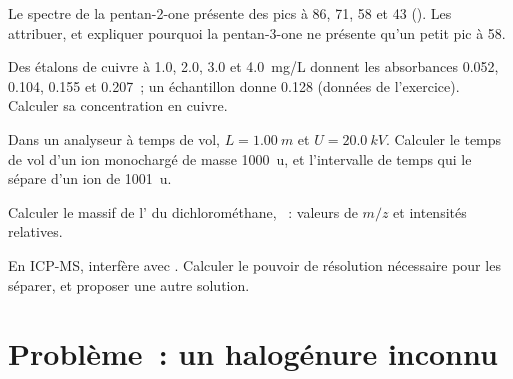 \begin{exercise}[$\star\star$]\label{exo:b2:mass-spec-atomic:8}
Le spectre de la pentan-2-one présente des pics à 86, 71, 58 et 43 (). Les attribuer, et
expliquer pourquoi la pentan-3-one ne présente qu'un petit pic à 58.
\end{exercise}

\begin{exercise}[$\star\star$]\label{exo:b2:mass-spec-atomic:9}
Des étalons de cuivre à 1.0, 2.0, 3.0 et \qty{4.0}{mg/L} donnent les absorbances 0.052, 0.104, 0.155 et
0.207~; un échantillon donne 0.128 (données de l'exercice). Calculer sa concentration en cuivre.
\end{exercise}

\begin{exercise}[$\star\star\star$]\label{exo:b2:mass-spec-atomic:10}
Dans un analyseur à temps de vol, $L = \qty{1.00}{m}$ et $U = \qty{20.0}{kV}$. Calculer le temps de vol
d'un ion monochargé de masse \qty{1000}{u}, et l'intervalle de temps qui le sépare d'un ion de \qty{1001}{u}.
\end{exercise}

\begin{exercise}[$\star\star\star$]\label{exo:b2:mass-spec-atomic:11}
Calculer le massif de l' du dichlorométhane, ~: valeurs de $m/z$ et intensités
relatives.
\end{exercise}

\begin{exercise}[$\star\star\star$]\label{exo:b2:mass-spec-atomic:12}
En ICP-MS,  interfère avec . Calculer le pouvoir de résolution nécessaire
pour les séparer, et proposer une autre solution.
\end{exercise}

\section{Problème~: un halogénure inconnu}

